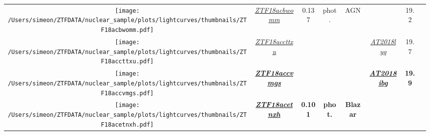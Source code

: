 \begin{table*}
{\begin{tabular}{c c  c  c  c   c  c  c}
      \parbox[c]{12em}{\texttt{[image: /Users/simeon/ZTFDATA/nuclear\_sample/plots/lightcurves/thumbnails/ZTF18acbwomm.pdf]}} & \textit{\href{https://ztfnuclear.simeonreusch.com/transient/ZTF18acbwomm}{ZTF18acbwomm}}
                                                                                                                                                  & 0.137                                                                                             & phot.          & AGN                     & ~                 & 19.2                       &                          \\
      \parbox[c]{12em}{\texttt{[image: /Users/simeon/ZTFDATA/nuclear\_sample/plots/lightcurves/thumbnails/ZTF18accttxu.pdf]}} & \textit{\href{https://ztfnuclear.simeonreusch.com/transient/ZTF18accttxu}{ZTF18accttxu}}          & ~              & ~                       & ~                 &
      \textit{\href{https://www.wis-tns.org/object/2018lyq}{AT2018lyq}}                                                                           & 19.7                                                                                              &                                                                                                                      \\
      \parbox[c]{12em}{\texttt{[image: /Users/simeon/ZTFDATA/nuclear\_sample/plots/lightcurves/thumbnails/ZTF18accvmgs.pdf]}} & \textbf{\textit{\href{https://ztfnuclear.simeonreusch.com/transient/ZTF18accvmgs}{ZTF18accvmgs}}} & ~              & ~                       & ~                 &
      \textbf{\textit{\href{https://www.wis-tns.org/object/2018ibg}{AT2018ibg}}}                                                                  & \textbf{19.9      }                                                                               &                                                                                                                      \\
      \parbox[c]{12em}{\texttt{[image: /Users/simeon/ZTFDATA/nuclear\_sample/plots/lightcurves/thumbnails/ZTF18acetnxh.pdf]}} & \textbf{\textit{\href{https://ztfnuclear.simeonreusch.com/transient/ZTF18acetnxh}{ZTF18acetnxh}}}
                                                                                                                                                  & \textbf{0.101}                                                                                    & \textbf{phot.} & \textbf{Blazar}         &

\end{tabular}}
\end{table*}
